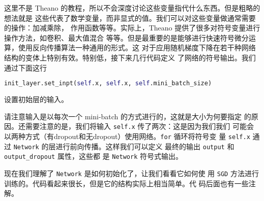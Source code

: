 这里不是 Theano 的教程，所以不会深度讨论这些变量指代什么东西。但是粗略的想法就是
这些代表了数学变量，而非显式的值。我们可以对这些变量做通常需要的操作：加减乘除，
作用函数等等。实际上，Theano 提供了很多对符号变量进行操作方法，如卷积、最大值混合
等等。但是最重要的是能够进行快速符号微分运算，使用反向传播算法一种通用的形式。这
对于应用随机梯度下降在若干种网络结构的变体上特别有效。特别低，接下来几行代码定义
了网络的符号输出。我们通过下面这行

\begin{lstlisting}[language=Python]
init_layer.set_inpt(self.x, self.x, self.mini_batch_size)
\end{lstlisting}

设置初始层的输入。

请注意输入是以每次一个 mini-batch 的方式进行的，这就是\minibatch{}大小为何要指定
的原因。还需要注意的是，我们将输入 \lstinline!self.x! 传了两次：这是因为我们我们
可能会以两种方式（有dropout和无dropout）使用网络。\lstinline!for! 循环将符号变
量 \lstinline!self.x! 通过 \lstinline!Network! 的层进行前向传播。这样我们可以定义
最终的输出 \lstinline!output! 和 \lstinline!output_dropout! 属性，这些都
是 \lstinline!Network! 符号式输出。

现在我们理解了 \lstinline!Network! 是如何初始化了，让我们看看它如何使
用 \lstinline!SGD! 方法进行训练的。代码看起来很长，但是它的结构实际上相当简单。代
码后面也有一些注解。

